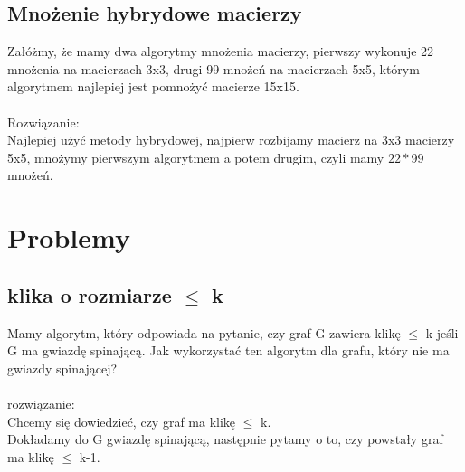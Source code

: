 \documentclass{article}
\begin{document}
\subsection*{Mnożenie hybrydowe macierzy}
Załóżmy, że mamy dwa algorytmy mnożenia macierzy,  pierwszy wykonuje 22 mnożenia na macierzach 3x3, drugi 99 mnożeń na macierzach 5x5, którym algorytmem 
najlepiej jest pomnożyć macierze 15x15. \\\\Rozwiązanie: \\
Najlepiej użyć metody hybrydowej, najpierw rozbijamy macierz na 3x3 macierzy 5x5, mnożymy pierwszym algorytmem a potem drugim, czyli mamy $22 * 99$ mnożeń.

\section{Problemy}
\subsection*{klika o rozmiarze $\leq$ k}
Mamy algorytm, który odpowiada na pytanie, czy graf G zawiera klikę $\leq$ k jeśli G ma gwiazdę spinającą.
Jak wykorzystać ten algorytm dla grafu, który nie ma gwiazdy spinającej? \\\\rozwiązanie:\\
Chcemy się dowiedzieć, czy graf ma klikę $\leq$ k. \\
Dokładamy do G gwiazdę spinającą, następnie pytamy o to, czy powstały graf ma klikę $\leq$ k-1.
\end{document}
